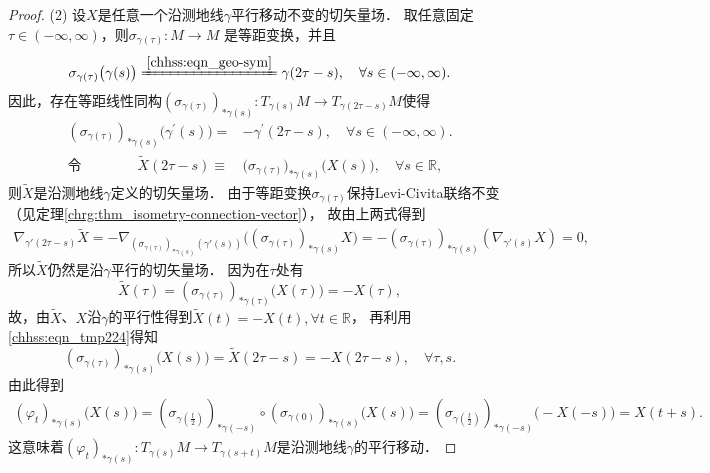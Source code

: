 \begin{proof}
(2) 设$X$是任意一个沿测地线$\gamma$平行移动不变的切矢量场．
取任意固定$\tau \in(-\infty, \infty)$，则$\sigma_{\gamma(\tau)}: M \rightarrow M$ 是等距变换，并且
\begin{equation}
\sigma_{\gamma(\tau)}\bigl(\gamma(s)\bigr) \xlongequal{\ref{chhss:eqn_geo-sym}}
\gamma(2 \tau-s), \quad \forall s \in(-\infty, \infty) .
\end{equation}
因此，存在等距线性同构$(\sigma_{\gamma(\tau)})_{* \gamma(s)}: T_{\gamma(s)} M \rightarrow T_{\gamma(2 \tau-s)}M$使得
\begin{align}
    (\sigma_{\gamma(\tau)})_{* \gamma(s)} \bigl(\gamma^{\prime}(s)\bigr)
    = & -\gamma^{\prime}(2 \tau-s), \quad \forall s \in(-\infty, \infty) . \\
    \text{令}\qquad\qquad \tilde{X}(2 \tau-s)\equiv&
    \bigl(\sigma_{\gamma(\tau)}\bigr)_{* \gamma(s)}\bigl(X(s)\bigr), 
    \quad \forall s\in \mathbb{R},  \label{chhss:eqn_tmp224}
\end{align}
则$\tilde{X}$是沿测地线$\gamma$定义的切矢量场．
由于等距变换$\sigma_{\gamma(\tau)}$保持Levi-Civita联络不变
（见定理\ref{chrg:thm_isometry-connection-vector}），
故由上两式得到
\begin{align*}
    \nabla_{\gamma'(2 \tau-s)} \tilde{X} = -\nabla_{(\sigma_{\gamma(\tau)})_{* \gamma(s)}(\gamma'(s))}
        \bigl((\sigma_{\gamma(\tau)})_{* \gamma(s)} X \bigr) 
     =-(\sigma_{\gamma(\tau)})_{*\gamma(s)}(\nabla_{\gamma'(s)} X)=0,
\end{align*}
所以$\tilde{X}$仍然是沿$\gamma$平行的切矢量场．
因为在$\tau$处有
\begin{equation}
    \tilde{X}(\tau)=(\sigma_{\gamma(\tau)})_{* \gamma(\tau)} \bigl(X(\tau)\bigr) = -X(\tau) ,
\end{equation}
故，由$\tilde{X}$、$X$沿$\gamma$的平行性得到$\tilde{X}(t)=-X(t), \forall t \in\mathbb{R}$，
再利用\eqref{chhss:eqn_tmp224}得知
\begin{equation}
    (\sigma_{\gamma(\tau)})_{*\gamma(s)}\bigl(X(s)\bigr)
    =\tilde{X}(2 \tau-s) = -X(2 \tau-s), \quad \forall \tau, s .
\end{equation}
由此得到
\setlength{\mathindent}{0em}
\begin{align*}
    (\varphi_t)_{* \gamma(s)}\bigl(X(s)\bigr) = (\sigma_{\gamma(\frac{t}{2})})_{* \gamma(-s)}
      \circ (\sigma_{\gamma(0)})_{* \gamma(s)}\bigl(X(s)\bigr) 
    = (\sigma_{\gamma(\frac{t}{2} ) } )_{* \gamma(-s)} \bigl(-X(-s)\bigr)=X(t+s) .
\end{align*}\setlength{\mathindent}{2em}
这意味着$(\varphi_t)_{* \gamma(s)}: T_{\gamma(s)} M \to T_{\gamma(s+t)} M$是沿测地线$\gamma$的平行移动．


\end{proof}
